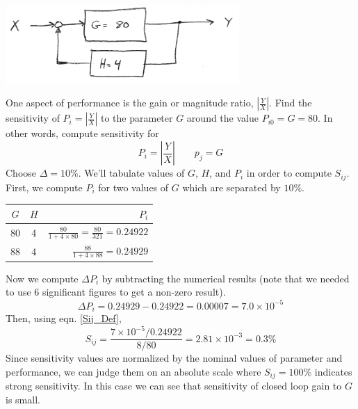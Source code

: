 \begin{ExampleSmall}\label{sensexample}
\includegraphics[width=3.5in]{figs06/00772a.png}

One aspect of performance is the gain or magnitude ratio, $\left |\frac{Y}{X} \right|$.
Find the sensitivity of $P_i = \left |\frac{Y}{X} \right|$ to the parameter $G$ around
the value $P_{i0}=G=80$.   In other words, compute sensitivity for
\[
P_i = \left |\frac{Y}{X} \right| \qquad p_j = G
\]
Choose $\Delta = 10\%$.  We'll tabulate values of $G$, $H$, and $P_i$ in order to compute $S_{ij}$.
First, we compute $P_i$ for two values of $G$ which are separated by $10\%$.

\vspace{0.2in}
\begin{tabular}{ccr} \hline
 $G$   &  $H$   &  $P_i$       \\ \hline
  80   &   4    & $\frac{80}{1+4\times80} = \frac{80}{321} = 0.24922$     \\ \hline
  88   &   4    & $\frac{88}{1+4\times88} = 0.24929$                      \\ \hline
\end{tabular}

\vspace{0.2in}
Now we compute $\Delta P_i$ by subtracting the numerical results
(note that we needed to use 6 significant figures to get a non-zero result).
\[
\Delta P_i = 0.24929 - 0.24922 = 0.00007 = 7.0\times10^{-5}
\]
Then, using eqn. \ref{Sij_Def},
\[
S_{ij} = \frac{7\times10^{-5}/0.24922}{8/80} = 2.81\times10^{-3} = 0.3\%
\]
Since sensitivity values are normalized by the nominal values of parameter and performance, we can judge them on an absolute scale where $S_{ij} =100\%$ indicates strong sensitivity.   In this case we can see that sensitivity of closed loop gain to $G$ is small.

\end{ExampleSmall}


